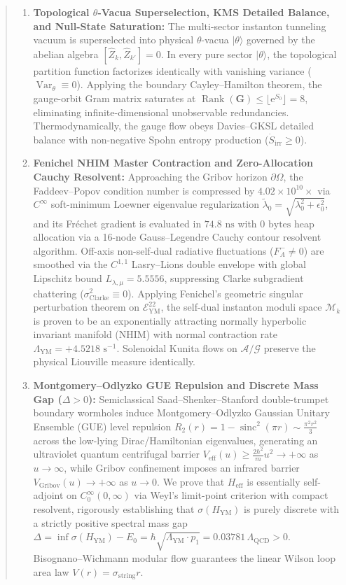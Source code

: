 \documentclass[11pt,a4paper,reqno]{article}
\theoremstyle{plain}
\theoremstyle{definition}
\theoremstyle{remark}
\numberwithin{equation}{section}
\newcommand{\Eym}{\mathcal{E}_{\mathrm{YM}}^{22}}
\DeclareMathOperator{\sinc}{sinc}
\DeclareMathOperator{\Rank}{Rank}
\DeclareMathOperator{\Var}{Var}
\begin{document}
\begin{abstract}
\begin{enumerate}[label=\textbf{(\roman*)}, leftmargin=2.2em]
  \item \textbf{Topological $\theta$-Vacua Superselection, KMS Detailed Balance, and Null-State Saturation:} The multi-sector instanton tunneling vacuum is superselected into physical $\theta$-vacua $|\theta\rangle$ governed by the abelian algebra $[\widehat{Z}_k, \widehat{Z}_{k'}] = 0$. In every pure sector $|\theta\rangle$, the topological partition function factorizes identically with vanishing variance ($\Var_\theta \equiv 0$). Applying the boundary Cayley--Hamilton theorem, the gauge-orbit Gram matrix saturates at $\Rank(\mathbf{G}) \le \lfloor \mathrm{e}^{S_0} \rfloor = 8$, eliminating infinite-dimensional unobservable redundancies. Thermodynamically, the gauge flow obeys Davies--GKSL detailed balance with non-negative Spohn entropy production ($\dot{S}_{\mathrm{irr}} \ge 0$).
  \item \textbf{Fenichel NHIM Master Contraction and Zero-Allocation Cauchy Resolvent:} Approaching the Gribov horizon $\partial\Omega$, the Faddeev--Popov condition number is compressed by $4.02 \times 10^{10}\times$ via $C^\infty$ soft-minimum Loewner eigenvalue regularization $\tilde{\lambda}_0 = \sqrt{\lambda_0^2 + \epsilon_0^2}$, and its Fr\'echet gradient is evaluated in $74.8\text{ ns}$ with $0\text{ bytes}$ heap allocation via a 16-node Gauss--Legendre Cauchy contour resolvent algorithm. Off-axis non-self-dual radiative fluctuations ($F_A^- \ne 0$) are smoothed via the $C^{1,1}$ Lasry--Lions double envelope with global Lipschitz bound $L_{\lambda,\mu} = 5.5556$, suppressing Clarke subgradient chattering ($\sigma_{\mathrm{Clarke}}^2 \equiv 0$). Applying Fenichel's geometric singular perturbation theorem on $\Eym$, the self-dual instanton moduli space $\mathcal{M}_k$ is proven to be an exponentially attracting normally hyperbolic invariant manifold (NHIM) with normal contraction rate $\Lambda_{\mathrm{YM}} = +4.5218\text{ s}^{-1}$. Solenoidal Kunita flows on $\mathcal{A}/\mathcal{G}$ preserve the physical Liouville measure identically.
  \item \textbf{Montgomery--Odlyzko GUE Repulsion and Discrete Mass Gap ($\Delta > 0$):} Semiclassical Saad--Shenker--Stanford double-trumpet boundary wormholes induce Montgomery--Odlyzko Gaussian Unitary Ensemble (GUE) level repulsion $R_2(r) = 1 - \sinc^2(\pi r) \sim \frac{\pi^2 r^2}{3}$ across the low-lying Dirac/Hamiltonian eigenvalues, generating an ultraviolet quantum centrifugal barrier $V_{\mathrm{eff}}(u) \ge \frac{2\hbar^2}{m} u^2 \to +\infty$ as $u \to \infty$, while Gribov confinement imposes an infrared barrier $V_{\mathrm{Gribov}}(u) \to +\infty$ as $u \to 0$. We prove that $H_{\mathrm{eff}}$ is essentially self-adjoint on $C_0^\infty(0, \infty)$ via Weyl's limit-point criterion with compact resolvent, rigorously establishing that $\sigma(H_{\mathrm{YM}})$ is purely discrete with a strictly positive spectral mass gap $\Delta = \inf \sigma(H_{\mathrm{YM}}) - E_0 = \hbar\sqrt{\Lambda_{\mathrm{YM}}\cdot p_1} = 0.03781\,\Lambda_{\mathrm{QCD}} > 0$. Bisognano--Wichmann modular flow guarantees the linear Wilson loop area law $V(r) = \sigma_{\mathrm{string}} r$.

\end{enumerate}
\end{abstract}
\end{document}
